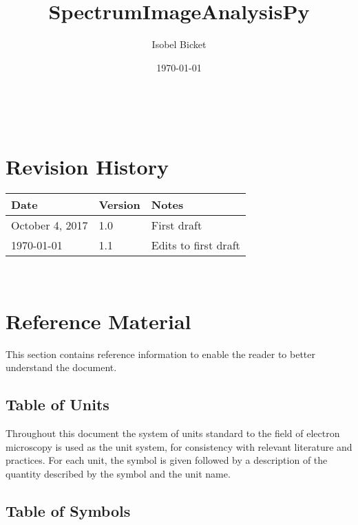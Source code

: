 \documentclass[12pt]{article}
\begin{document}
\label{doc:SRS}

\title{SpectrumImageAnalysisPy} 
\author{Isobel Bicket}
\date{\today}
	
\maketitle

~\newpage



\section{Revision History}

\begin{tabularx}{\textwidth}{p{4cm}p{2cm}X}
	\toprule {\bf Date} & {\bf Version} & {\bf Notes}\\
	\midrule
	October 4, 2017  & 1.0 & First draft\\
	\today & 1.1 & Edits to first draft\\
	\bottomrule
\end{tabularx}

~\newpage

\tableofcontents

\section{Reference Material}
\label{SRS:RefMat}

This section contains reference information to enable the reader to better
understand the document.

\subsection{Table of Units}
\label{TableUnits}

Throughout this document the system of units standard to the field of electron
microscopy is used
as the unit system, for consistency with relevant literature and practices. For
each unit, the symbol is given followed by a
description of the quantity described by the symbol and the unit name.
~\newline




\subsection{Table of Symbols}
\label{TableSymbols}
\end{document}
